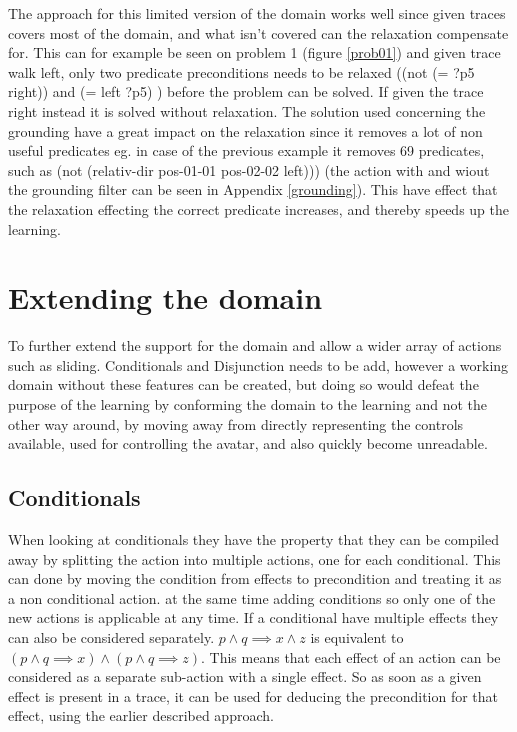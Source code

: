The approach for this limited version of the domain works well since given traces covers most of the domain, and what isn't covered can the relaxation compensate for. This can for example be seen on problem 1 (figure \ref{prob01}) and given trace walk left, only two predicate preconditions needs to be relaxed ((not (= ?p5 right)) and (= left ?p5) ) before the problem can be solved. If given the trace right instead it is solved without relaxation. The solution used concerning the grounding have a great impact on the relaxation since it removes a lot of non useful predicates eg. in case of the previous example it removes 69 predicates, such as (not (relativ-dir pos-01-01 pos-02-02 left))) (the action with and wiout the grounding filter can be seen in Appendix \ref{grounding}). This have effect that the relaxation effecting the correct predicate increases, and thereby speeds up the learning.


\section{Extending the domain}
	To further extend the support for the domain and allow a wider array of actions such as sliding. Conditionals and Disjunction needs to be add, however a working domain without these features can be created, but doing so would defeat the purpose of the learning by conforming the domain to the learning and not the other way around, by moving away from directly representing the controls available, used for controlling the avatar, and also quickly become unreadable.
		
\subsection{Conditionals}	
	When looking at conditionals they have the property that they can be compiled away by splitting the action into multiple actions, one for each conditional. This can done by moving the condition from effects to precondition and treating it as a non conditional action. at the same time adding conditions so only one of the new actions is applicable at any time. If a conditional have multiple effects they can also be considered separately.
	$p \land q \implies x \land z$
	is equivalent to 
	$(p \land q \implies x)
	\land
	(p \land q \implies z)$. 
	This means that each effect of an action can be considered as a separate sub-action with a single effect. So as soon as a given effect is present in a trace, it can be used for deducing the precondition for that effect, using the earlier described approach. 
	
